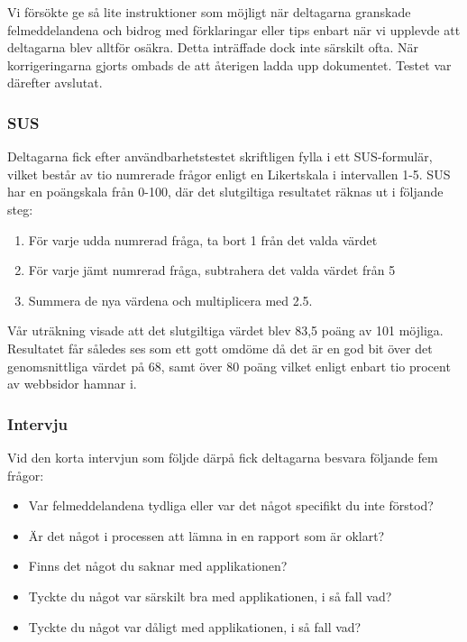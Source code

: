 \documentclass[swedish]{maucsthesis}
\begin{document}
Vi försökte ge så lite instruktioner som möjligt när deltagarna granskade
felmeddelandena och bidrog med förklaringar eller tips enbart när vi upplevde
att deltagarna blev alltför osäkra. Detta inträffade dock inte särskilt ofta.
När korrigeringarna gjorts ombads de att återigen ladda upp dokumentet. Testet
var därefter avslutat.

\subsubsection{SUS}

Deltagarna fick efter användbarhetstestet skriftligen fylla i ett SUS-formulär, vilket består av tio
numrerade frågor enligt en Likertskala i intervallen 1-5. SUS har en poängskala från 0-100, där det
slutgiltiga resultatet räknas ut i följande steg:

\begin{enumerate}
\item För varje udda numrerad fråga, ta bort 1 från det valda värdet
\item För varje jämt numrerad fråga, subtrahera det valda värdet från 5
\item Summera de nya värdena och multiplicera med 2.5.
\end{enumerate}

Vår uträkning visade att det slutgiltiga värdet blev 83,5 poäng av 101 möjliga.
Resultatet får således ses som ett gott omdöme då det är en god bit över det
genomsnittliga värdet på 68, samt över 80 poäng vilket enligt
\cite{laubheimer:2018} enbart tio procent av webbsidor hamnar i.

\subsubsection{Intervju}

Vid den korta intervjun som följde därpå fick deltagarna besvara följande fem
frågor:
\begin{itemize}
\item Var felmeddelandena tydliga eller var det något specifikt du inte förstod?
\item Är det något i processen att lämna in en rapport som är oklart?
\item Finns det något du saknar med applikationen?
\item Tyckte du något var särskilt bra med applikationen, i så fall vad?
\item Tyckte du något var dåligt med applikationen, i så fall vad?
\end{itemize}
\end{document}
